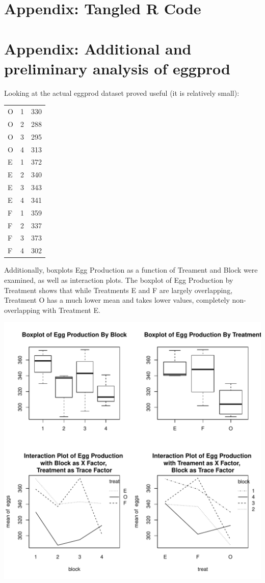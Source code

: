 \documentclass[11pt]{article}
\begin{document}
\section{Appendix: Tangled R Code}
\label{sec-3}


 
\section{Appendix: Additional and preliminary analysis of eggprod}
\label{sec-4}


Looking at the actual eggprod dataset proved useful (it is relatively
small):


\begin{center}
\begin{tabular}{lrr}
 O  &  1  &  330  \\
 O  &  2  &  288  \\
 O  &  3  &  295  \\
 O  &  4  &  313  \\
 E  &  1  &  372  \\
 E  &  2  &  340  \\
 E  &  3  &  343  \\
 E  &  4  &  341  \\
 F  &  1  &  359  \\
 F  &  2  &  337  \\
 F  &  3  &  373  \\
 F  &  4  &  302  \\
\end{tabular}
\end{center}



 
Additionally, boxplots Egg Production as a function of Treament and
Block were examined, as well as interaction plots. The boxplot of Egg
Production by Treatment shows that while Treatments E and F are
largely overlapping, Treatment O has a much lower mean and takes
lower values, completely non-overlapping with Treatment E.



\includegraphics[width=.9\linewidth]{eggprod1.pdf}
\end{document}
